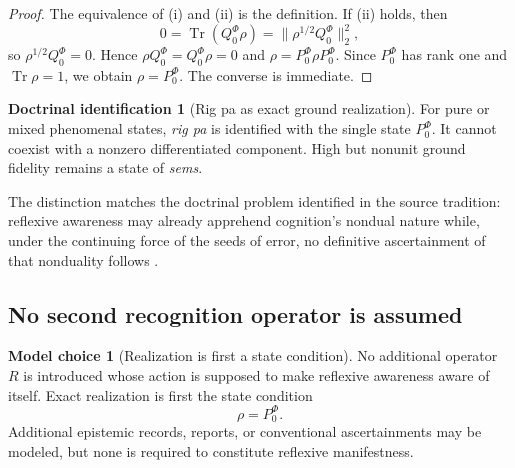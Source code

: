 \documentclass[11pt,reqno]{scrartcl}
\newcommand{\PzeroF}{P_{0}^{\Phi}}
\newcommand{\QzeroF}{Q_{0}^{\Phi}}
\DeclareMathOperator{\Tr}{Tr}
\theoremstyle{plain}
\theoremstyle{definition}
\newtheorem{identification}[identification]{Doctrinal identification}
\newtheorem{modelchoice}[modelchoice]{Model choice}
\theoremstyle{remark}
\begin{document}
\begin{proof}
The equivalence of (i) and (ii) is the definition.  If (ii) holds, then
\begin{equation}
  0=\Tr(\QzeroF\rho)
  =\|\rho^{1/2}\QzeroF\|_2^2,
\end{equation}
so $\rho^{1/2}\QzeroF=0$.  Hence $\rho\QzeroF=\QzeroF\rho=0$ and
$\rho=\PzeroF\rho\PzeroF$.  Since $\PzeroF$ has rank one and $\Tr\rho=1$,
we obtain $\rho=\PzeroF$.  The converse is immediate.
\end{proof}

\begin{identification}[Rig pa as exact ground realization]
\label{id:rigpa-density}
For pure or mixed phenomenal states, \emph{rig pa} is identified with the
single state $\PzeroF$.  It cannot coexist with a nonzero differentiated
component.  High but nonunit ground fidelity remains a state of \emph{sems}.
\end{identification}

The distinction matches the doctrinal problem identified in the source
tradition: reflexive awareness may already apprehend cognition's nondual
nature while, under the continuing force of the seeds of error, no definitive
ascertainment of that nonduality follows \cite[p.~425]{Yiannopoulos2020}.

\subsection{No second recognition operator is assumed}

\begin{modelchoice}[Realization is first a state condition]
\label{choice:no-recognition-operator}
No additional operator $R$ is introduced whose action is supposed to make
reflexive awareness aware of itself.  Exact realization is first the state
condition
\begin{equation}
  \rho=\PzeroF.
  \label{eq:realization-state-not-second-operator}
\end{equation}
Additional epistemic records, reports, or conventional ascertainments may be
modeled, but none is required to constitute reflexive manifestness.
\end{modelchoice}
\end{document}
